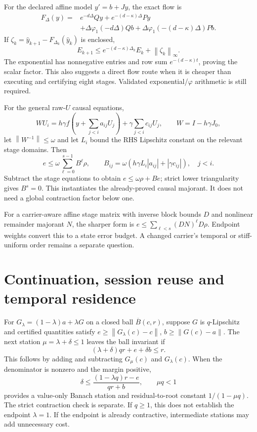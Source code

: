 \documentclass[aps,pra,reprint,onecolumn,11pt,notitlepage,nofootinbib]{revtex4-2}
\newcommand{\norm}[1]{\left\|#1\right\|}
\begin{document}
For the declared affine model $y'=b+Jy$, the exact flow is
\begin{align}
 F_\Delta(y)={}&e^{-d\Delta}Qy+e^{-(d-\kappa)\Delta}Py\\
 &+\Delta\varphi_1(-d\Delta)Qb
  +\Delta\varphi_1(-(d-\kappa)\Delta)Pb.
\end{align}
If $\zeta_k=\widehat y_{k+1}-F_{\Delta_k}(\widehat y_k)$ is enclosed,
\begin{equation}
 E_{k+1}\le e^{-(d-\kappa)\Delta_k}E_k+\norm{\zeta_k}_\infty.
\end{equation}
The exponential has nonnegative entries and row sum
$e^{-(d-\kappa)t}$, proving the scalar factor. This also suggests a direct
flow route when it is cheaper than executing and certifying eight stages.
Validated exponential/$\varphi$ arithmetic is still required.

For the general raw-$U$ causal equations,
\begin{equation}
 WU_i=h\gamma f\left(y+\sum_{j<i}a_{ij}U_j\right)
       +\gamma\sum_{j<i}c_{ij}U_j,\qquad W=I-h\gamma J_0,
\end{equation}
let $\norm{W^{-1}}\le\omega$ and let $L_i$ bound the RHS Lipschitz constant
on the relevant stage domains. Then
\begin{equation}
 e\le\omega\sum_{\ell=0}^{s-1}B^\ell\rho,
 \qquad B_{ij}=\omega(h\gamma L_i|a_{ij}|+|\gamma c_{ij}|),\quad j<i.
\end{equation}
Subtract the stage equations to obtain $e\le\omega\rho+Be$; strict lower
triangularity gives $B^s=0$. This instantiates the already-proved causal
majorant. It does not need a global contraction factor below one.

For a carrier-aware affine stage matrix with inverse block bounds $D$ and
nonlinear remainder majorant $N$, the sharper form is
$e\le\sum_{\ell<s}(DN)^\ell D\rho$.
Endpoint weights convert this to a state error budget. A changed carrier's
temporal or stiff-uniform order remains a separate question.

\section{Continuation, session reuse and temporal residence}
For $G_\lambda=(1-\lambda)a+\lambda G$ on a closed ball
$\overline B(c,r)$, suppose $G$ is $q$-Lipschitz and certified quantities
satisfy $e\ge\norm{G_\lambda(c)-c}$, $b\ge\norm{G(c)-a}$. The next
station $\mu=\lambda+\delta\le1$ leaves the ball invariant if
\begin{equation}
 (\lambda+\delta)qr+e+\delta b\le r.
\end{equation}
This follows by adding and subtracting $G_\mu(c)$ and $G_\lambda(c)$.
When the denominator is nonzero and the margin positive,
\begin{equation}
 \delta\le\frac{(1-\lambda q)r-e}{qr+b},\qquad \mu q<1
\end{equation}
provides a value-only Banach station and residual-to-root constant
$1/(1-\mu q)$. The strict contraction check is separate. If $q\ge1$, this
does not establish the endpoint $\lambda=1$. If the endpoint is already
contractive, intermediate stations may add unnecessary cost.
\end{document}
